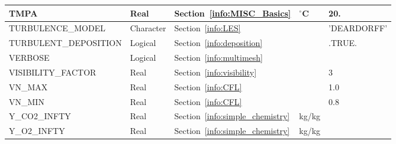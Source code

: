 \documentclass[11pt]{book}
\begin{document}
\begin{longtable}{@{\extracolsep{\fill}}|l|l|l|l|l|}
{\ct TMPA}                                      & Real          & Section~\ref{info:MISC_Basics}                        & $^\circ$C     & 20.               \\ \hline
{\ct TURBULENCE\_MODEL}                         & Character     & Section~\ref{info:LES}                                &               & {\ct 'DEARDORFF'} \\ \hline
{\ct TURBULENT\_DEPOSITION}                     & Logical       & Section~\ref{info:deposition}                         &               & {\ct .TRUE.}      \\ \hline
{\ct VERBOSE}                                   & Logical       & Section~\ref{info:multimesh}                          &               &                   \\ \hline
{\ct VISIBILITY\_FACTOR}                        & Real          & Section~\ref{info:visibility}                         &               & 3                 \\ \hline
{\ct VN\_MAX}                                   & Real          & Section~\ref{info:CFL}                                &               & 1.0               \\ \hline
{\ct VN\_MIN}                                   & Real          & Section~\ref{info:CFL}                                &               & 0.8               \\ \hline
{\ct Y\_CO2\_INFTY}                             & Real          & Section~\ref{info:simple_chemistry}                   &  kg/kg        &                   \\ \hline
{\ct Y\_O2\_INFTY}                              & Real          & Section~\ref{info:simple_chemistry}                   &  kg/kg        &                   \\ \hline
\end{longtable}


\vspace{\baselineskip}
\end{document}

